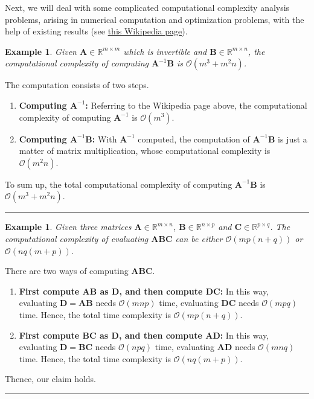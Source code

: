 \documentclass[twoside]{article}
\newtheorem{example}[theorem]{Example}
\newenvironment{proof}{{\bf Explanation:}}{\hfill\rule{2mm}{2mm}}
\begin{document}
Next, we will deal with some complicated computational complexity analysis problems, arising in numerical computation and optimization problems, with the help of existing results (see \href{https://en.wikipedia.org/wiki/Computational_complexity_of_mathematical_operations}{this Wikipedia page}).
\begin{example}\normalfont
Given $\boldsymbol{A}\in\mathbb{R}^{m\times m}$ which is invertible and $\boldsymbol{B}\in\mathbb{R}^{m\times n}$, the computational complexity of computing $\boldsymbol{A}^{-1}\boldsymbol{B}$ is $\mathcal{O}(m^{3}+m^{2}n)$.
\end{example}

\begin{proof}
    The computation consists of two steps.
    \begin{enumerate}[leftmargin=*]
        \item {\bf Computing $\boldsymbol{A}^{-1}$:} Referring to the Wikipedia page above, the computational complexity of computing $\boldsymbol{A}^{-1}$ is $\mathcal{O}(m^{3})$.
        \item {\bf Computing $\boldsymbol{A}^{-1}\boldsymbol{B}$:} With $\boldsymbol{A}^{-1}$ computed, the computation of $\boldsymbol{A}^{-1}\boldsymbol{B}$ is just a matter of matrix multiplication, whose computational complexity is $\mathcal{O}(m^{2}n)$.
    \end{enumerate}
    To sum up, the total computational complexity of computing $\boldsymbol{A}^{-1}\boldsymbol{B}$ is $\mathcal{O}(m^{3}+m^{2}n)$.
\end{proof}
\newpage
\begin{example}\normalfont
    Given three matrices $\boldsymbol{A}\in\mathbb{R}^{m\times n}$, $\boldsymbol{B}\in\mathbb{R}^{n\times p}$ and $\boldsymbol{C}\in\mathbb{R}^{p\times q}$. The computational complexity of evaluating $\boldsymbol{A}\boldsymbol{B}\boldsymbol{C}$ can be either $\mathcal{O}(mp(n+q))$ or $\mathcal{O}(nq(m+p))$.
\end{example}

\begin{proof}
    There are two ways of computing $\boldsymbol{A}\boldsymbol{B}\boldsymbol{C}$.
    \begin{enumerate}[leftmargin=*]
        \item {\bf First compute $\boldsymbol{A}\boldsymbol{B}$ as $\boldsymbol{D}$, and then compute $\boldsymbol{D}\boldsymbol{C}$:} In this way, evaluating $\boldsymbol{D}=\boldsymbol{A}\boldsymbol{B}$ needs $\mathcal{O}(mnp)$ time, evaluating $\boldsymbol{D}\boldsymbol{C}$ needs $\mathcal{O}(mpq)$ time. Hence, the total time complexity is $\mathcal{O}(mp(n+q))$.
        \item {\bf First compute $\boldsymbol{B}\boldsymbol{C}$ as $\boldsymbol{D}$, and then compute $\boldsymbol{A}\boldsymbol{D}$:} In this way, evaluating $\boldsymbol{D}=\boldsymbol{B}\boldsymbol{C}$ needs $\mathcal{O}(npq)$ time, evaluating $\boldsymbol{A}\boldsymbol{D}$ needs $\mathcal{O}(mnq)$ time. Hence, the total time complexity is $\mathcal{O}(nq(m+p))$.
    \end{enumerate}
    Thence, our claim holds.
\end{proof}
\end{document}
